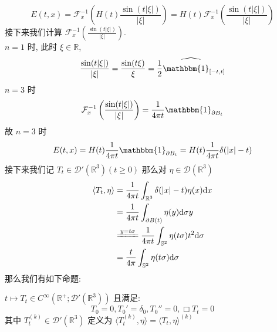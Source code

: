 \documentclass[11pt]{ctexart}[UTF8]
\begin{document}
\begin{equation*}
    E(t,x) = \mathcal{F}_{x}^{-1}\left( H(t)\frac{\sin(t|\xi|)}{|\xi|} \right) = H(t) \mathcal{F}_{x}^{-1}\left( \frac{\sin(t|\xi|)}{|\xi|} \right)
\end{equation*}
接下来我们计算 $\mathcal{F}_{x}^{-1}\left( \frac{\sin(t|\xi|)}{|\xi|} \right)$. \\
$n=1$ 时, 此时 $\xi \in \mathbb{R}$,
\begin{equation*}
    \frac{\sin(t|\xi|)}{|\xi|} = \frac{\sin(t\xi)}{\xi} = \widehat{\frac{1}{2}\mathbbm{1}_{[-t,t]}}
\end{equation*}
$n=3$ 时
\begin{equation*}
    \mathcal{F}_{x}^{-1}\left( \frac{\sin(t|\xi|)}{|\xi|} \right) = \frac{1}{4\pi t} \mathbbm{1}_{\partial B_{t}}
\end{equation*}
故 $n=3$ 时
\begin{equation*}
    E(t,x) = H(t) \frac{1}{4\pi t} \mathbbm{1}_{\partial B_{t}} = H(t) \frac{1}{4\pi t} \delta(|x| - t)
\end{equation*}
接下来我们记 $T_{t} \in \mathscr{D}'(\mathbb{R}^{3})(t \geq 0)$ 那么对 $\eta \in \mathscr{D}(\mathbb{R}^{3})$
\begin{equation*}
    \begin{aligned}
        \langle T_{t}, \eta \rangle &= \frac{1}{4\pi t}\int_{\mathbb{R}^{3}}  \delta(|x| - t) \eta(x) \mathrm{d}x\\
        &= \frac{1}{4\pi t}\int_{\partial B(t)} \eta(y) \mathrm{d}\sigma{y} \\
        &\xlongequal{y=t\sigma}\frac{1}{4\pi t}\int_{\mathbb{S}^{2}}  \eta(t\sigma)t^2 \mathrm{d}\sigma\\
        &= \frac{t}{4\pi}\int_{\mathbb{S}^{2}}  \eta(t\sigma) \mathrm{d}\sigma
    \end{aligned}
\end{equation*}
那么我们有如下命题:
\begin{proposition}
    $t \longmapsto T_{t} \in C^{\infty}(\mathbb{R}^{+}; \mathscr{D}'(\mathbb{R}^{3}))$ 且满足:
    \begin{equation*}
        T_{0} = 0,T_{0}'=\delta_{0},T_{0}''=0, \Box T_{t}=0
    \end{equation*}
    其中 $T_{t}^{(k)} \in \mathscr{D}'(\mathbb{R}^{3})$ 定义为 $\langle T_{t}^{(k)}, \eta \rangle =  \langle T_{t}, \eta \rangle^{(k)}$
\end{proposition}
\end{document}
